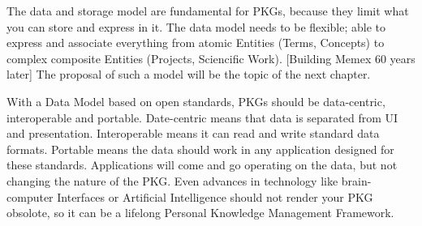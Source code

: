 The data and storage model are fundamental for PKGs, because they limit what you can store and express in it. The data model needs to be flexible; able to express and associate everything from atomic Entities (Terms, Concepts) to complex composite Entities (Projects, Sciencific Work). [Building Memex 60 years later] The proposal of such a model will be the topic of the next chapter.

With a Data Model based on open standards, PKGs should be data-centric, interoperable and portable. Date-centric means that data is separated from UI and presentation. Interoperable means it can read and write standard data formats. Portable means the data should work in any application designed for these standards. Applications will come and go operating on the data, but not changing the nature of the PKG. Even advances in technology like brain-computer Interfaces or Artificial Intelligence should not render your PKG obsolote, so it can be a lifelong Personal Knowledge Management Framework.